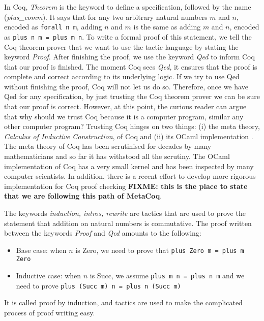 \documentclass[conference,compsoc]{IEEEtran}
\begin{document}
In Coq, \emph{Theorem} is the keyword
to define a specification, followed by the name (\emph{plus\_comm}). 
It says that for any two arbitrary natural numbers $m$ and $n$, 
encoded as \texttt{forall n m}, adding $n$ and $m$ is the same
as adding $m$ and $n$, encoded as \texttt{plus n m = plus m n}.
To write a formal proof of this statement, we tell the Coq theorem 
prover that we want to use the tactic language by 
stating the keyword \emph{Proof}. After finishing the proof, 
we use the keyword \emph{Qed} to inform Coq that our proof is 
finished. The moment Coq sees \emph{Qed},
it ensures that the proof is complete and correct according to its 
underlying logic. If we try to use Qed without finishing the proof,
Coq will not let us do so. Therefore, once we have Qed for any 
specification, by just trusting the Coq theorem prover we can be 
sure that our proof is correct. However, at this point, 
the curious reader can argue that why should we trust 
Coq because it is a computer program, similar any other 
computer program? Trusting Coq hinges on two things: 
(i) the meta theory, \emph{Calculus of Inductive Construction},
of Coq \cite{thierry1988calculus}
and (ii) its OCaml implementation \cite{the_coq_development_team}.
The meta theory of Coq has been scrutinised for decades
by many mathematicians and so far it has withstood all 
the scrutiny. The OCaml implementation of Coq  has a very 
small kernel and has been inspected by many computer scientists. 
In addition, there is a recent effort to develop more 
rigorous implementation for Coq proof checking \cite{10.1145/3371076} \textbf{FIXME: this is the place 
to state that we are following this path of MetaCoq}.



The keywords \emph{induction, intros, rewrite}
are tactics that are used to prove the statement that addition 
on natural numbers is commutative. 
The proof written between 
the keywords \emph{Proof} and \emph{Qed} amounts to the following: 
\begin{itemize}
  \item Base case: when $n$ is Zero, we need to prove that \texttt{plus Zero m = plus m Zero}
  \item Inductive case: when $n$ is Succ, we assume \texttt{plus m n = plus n m} 
      and we need to prove \texttt{plus (Succ m) n = plus n (Succ m)}
\end{itemize}  
\noindent
It is called proof by induction, and 
tactics are used to make the complicated 
process of proof writing easy.
\end{document}
